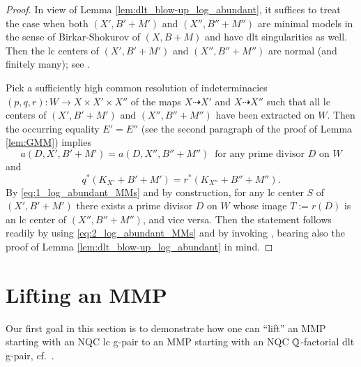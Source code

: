 	\begin{proof}
		In view of Lemma \ref{lem:dlt_blow-up_log_abundant}, it suffices to treat the case when both $(X',B'+M')$ and $(X'',B''+M'')$ are minimal models in the sense of Birkar-Shokurov of $(X,B+M)$ and have dlt singularities as well. Then the lc centers of $(X',B'+M')$ and $(X'',B''+M'')$ are normal (and finitely many); see \cite[Subsection 2.3]{HanLi22}. 
		
		Pick a sufficiently high common resolution of indeterminacies $ (p,q,r) \colon W \to X \times X' \times X'' $ of the maps $ X \dashrightarrow X' $ and $ X \dashrightarrow X'' $ such that all lc centers of $(X',B'+M')$ and $(X'',B''+M'')$ have been extracted on $ W $. Then the occurring equality $E' = E''$ (see the second paragraph of the proof of Lemma \ref{lem:GMM}) implies
		\begin{equation}\label{eq:1_log_abundant_MMs}
			a(D,X',B'+M') = a(D,X'',B''+M'') \ \text{ for any prime divisor $D$ on $W$} 
		\end{equation}
		and
		\begin{equation}\label{eq:2_log_abundant_MMs}
			q^* (K_{X'} + B' + M') = r^* (K_{X''} + B'' + M'') .
		\end{equation}
		By \eqref{eq:1_log_abundant_MMs} and by construction, for any lc center $S$ of $(X',B'+M')$ there exists a prime divisor $D$ on $W$ whose image $T := r(D)$ is an lc center of $(X'',B''+M'')$, and vice versa. Then the statement follows readily by using \eqref{eq:2_log_abundant_MMs} and by invoking \cite[Remark 2.15(2)]{Hash20d}, bearing also the proof of Lemma \ref{lem:dlt_blow-up_log_abundant} in mind.
	\end{proof}
	
	
	
	
	\section{Lifting an MMP}
	\label{section:lifting_MMP}
	
	Our first goal in this section is to demonstrate how one can \enquote{lift} an MMP starting with an NQC lc g-pair to an MMP starting with an NQC $\mathbb{Q}$-factorial dlt g-pair, cf.\ \cite[Section 3]{LMT}.
	
	\medskip
	
